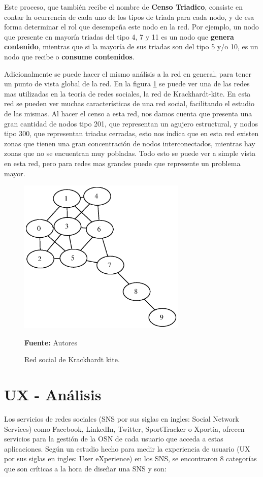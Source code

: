 Este proceso, que también recibe el nombre de \textbf{Censo Triadico}, consiste en contar la ocurrencia de cada uno de los tipos de triada para cada nodo, y de esa forma determinar el rol que desempeña este nodo en la red. Por ejemplo, un nodo que presente en mayoría triadas del tipo 4, 7 y 11 es un nodo que \textbf{genera contenido}, mientras que si la mayoría de sus triadas son del tipo 5 y/o 10, es un nodo que recibe o \textbf{consume contenidos}.

Adicionalmente se puede hacer el mismo análisis a la red en general, para tener un punto de vista global de la red. En la figura \ref{fig:red_krackhardt} se puede ver una de las redes mas utilizadas en la teoría de redes sociales, la red de Krackhardt-kite. En esta red se pueden ver muchas características de una red social, facilitando el estudio de las mismas. Al hacer el censo a esta red, nos damos cuenta que presenta una gran cantidad de nodos tipo 201, que representan un agujero estructural, y nodos tipo 300, que representan triadas cerradas, esto nos indica que en esta red existen zonas que tienen una gran concentración de nodos interconectados, mientras hay zonas que no se encuentran muy pobladas. Todo esto se puede ver a simple vista en esta red, pero para redes mas grandes puede que represente un problema mayor.

\begin{figure}[!htb]
  \begin{center}
    \includegraphics[width=8cm]{./imagenes/red_krackhardt_kite.eps}
    \caption{Red social de Krackhardt kite.}
    \label{fig:red_krackhardt}
    \textbf{Fuente:}  Autores
  \end{center}
\end{figure}



\section{UX - Análisis} \label{sec:UX}
Los servicios de redes sociales (SNS por sus siglas en ingles: Social Network Services) como Facebook, LinkedIn, Twitter, SportTracker o Xportia, ofrecen servicios para la gestión de la OSN de cada usuario que acceda a estas aplicaciones. Según un estudio hecho para medir la experiencia de usuario \cite{user_behavior_online} (UX por sus siglas en ingles: User eXperience) en los SNS, se encontraron 8 categorías que son críticas a la hora de diseñar una SNS y son:

